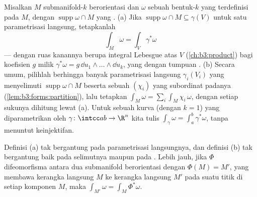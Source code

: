 \begin{definition}\label{def:b3:forms:integral}
Misalkan $M$ submanifold-$k$ berorientasi dan $\omega$ sebuah
bentuk-$k$ yang terdefinisi pada  $M$, dengan
$\operatorname{supp}\omega \cap M$ yang .
(a) Jika $\operatorname{supp}\omega \cap M \subseteq
\gamma(V)$ untuk satu parametrisasi langsung, tetapkanlah
\[
\int_M\omega = \int_V\gamma^*\omega
\]
--- dengan ruas kanannya berupa integral Lebesgue atas $V$
(\cref{ch:b3:product}) bagi koefisien $g$ milik
$\gamma^*\omega = g\,\dd u_1\wedge\dots\wedge\dd u_k$, yang
 dengan tumpuan .
(b) Secara umum, pilihlah berhingga banyak parametrisasi langsung
$\gamma_i(V_i)$ yang menyelimuti 
$\operatorname{supp}\omega \cap M$ beserta sebuah
 $(\chi_i)$ yang subordinat padanya
(\cref{lem:b3:forms:partition}), lalu tetapkan $\int_M\omega =
\sum_i\int_M\chi_i\,\omega$, dengan setiap sukunya dihitung lewat (a).
Untuk sebuah kurva (dengan $k = 1$) yang diparametrikan oleh
$\gamma\colon\intcc ab\to\R^n$ kita tulis
$\int_\gamma\omega = \int_a^b\gamma^*\omega$, tanpa menuntut
keinjektifan.
\end{definition}

\begin{lemma}[Kekonsistenan]\label{lem:b3:forms:consistency}
Definisi (a) tak bergantung pada parametrisasi
langsungnya, dan definisi (b) tak bergantung baik pada
selimutnya maupun pada . Lebih jauh, jika
$\Phi$ difeomorfisma antara  dua submanifold
berorientasi dengan $\Phi(M) = M'$, yang membawa kerangka langsung
$M$ ke kerangka langsung $M'$ pada suatu titik di setiap
komponen $M$, maka $\int_{M'}\omega =
\int_M\Phi^*\omega$.
\end{lemma}

